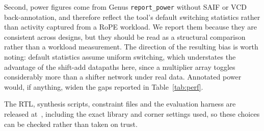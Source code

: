 Second, power figures come from Genus \texttt{report\_power} without SAIF or
VCD back-annotation, and therefore reflect the tool's default switching
statistics rather than activity captured from a RoPE workload. We report them
because they are consistent across designs, but they should be read as a
structural comparison rather than a workload measurement. The direction of
the resulting bias is worth noting: default statistics assume uniform
switching, which understates the advantage of the shift-add datapaths here,
since a multiplier array toggles considerably more than a shifter network
under real data. Annotated power would, if anything, widen the gaps reported
in Table~\ref{tab:perf}.

The RTL, synthesis scripts, constraint files and the evaluation harness are
released at~\cite{github}, including the exact library and corner settings
used, so these choices can be checked rather than taken on trust.
